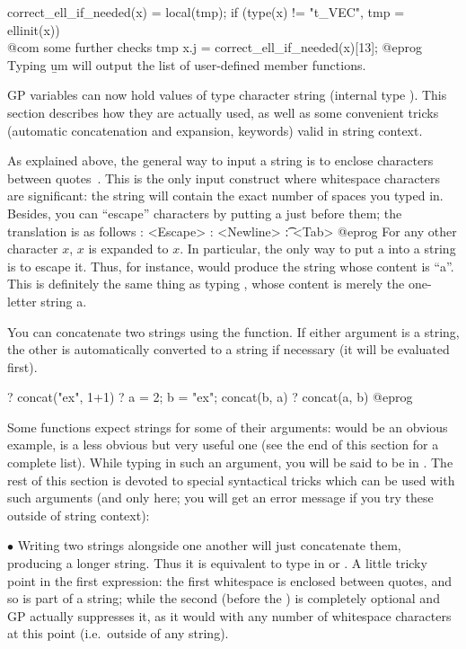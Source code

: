 \bprog
correct_ell_if_needed(x) = 
{
  local(tmp);
  if (type(x) != "t_VEC", tmp = ellinit(x))
    \\ @com some further checks
  tmp
}
x.j = correct_ell_if_needed(x)[13];
@eprog
Typing \b{um} will output the list of user-defined member functions.

\label{se:strings}

\noindent
GP variables can now hold values of type character string (internal type
). This section describes how they are actually used, as well as
some convenient tricks (automatic concatenation and expansion, keywords)
valid in string context.

As explained above, the general way to input a string is to enclose
characters between quotes~. This is the only input construct where
whitespace characters are significant: the string will contain the exact
number of spaces you typed in. Besides, you can ``escape'' characters by
putting a \kbd{\bs} just before them; the translation is as follows
\bprog
   \e: <Escape>
   \n: <Newline>
   \t: <Tab>
@eprog
For any other character $x$, \b{$x$} is expanded to $x$. In particular, the
only way to put a  into a string is to escape it. Thus, for
instance,  would produce the string whose content is
``a''. This is definitely  the same thing as typing ,
whose content is merely the one-letter string a.

You can concatenate two strings using the  function. If either
argument is a string, the other is automatically converted to a string if
necessary (it will be evaluated first).

\bprog
? concat("ex", 1+1)
? a = 2; b = "ex"; concat(b, a)
? concat(a, b)
@eprog

Some functions expect strings for some of their arguments:  would
be an obvious example,  is a less obvious but very useful one (see
the end of this section for a complete list). While typing in such an
argument, you will be said to be in . The rest of
this section is devoted to special syntactical tricks which can be used with
such arguments (and only here; you will get an error message if you try these
outside of string context):

$\bullet$ Writing two strings alongside one another will just concatenate
them, producing a longer string. Thus it is equivalent to type in
 or . A little tricky point in the first expression:
the first whitespace is enclosed between quotes, and so is part of a string;
while the second (before the ) is completely optional and GP
actually suppresses it, as it would with any number of whitespace characters
at this point (i.e.~outside of any string).

